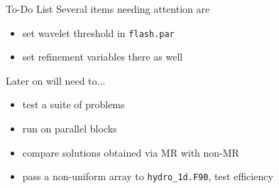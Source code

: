 \documentclass{beamer}
\begin{document}
\begin{frame}[fragile]{To-Do List}
  Several items needing attention are
  \begin{itemize}
    \setlength\itemsep{1em}
    \item<2-> set wavelet threshold in \texttt{flash.par}
    \item<3-> set refinement variables there as well
  \end{itemize}
  Later on will need to...
  \begin{itemize}
    \item<4-> test a suite of problems
    \item<5-> run on parallel blocks
    \item<6-> compare solutions obtained via MR with non-MR
    \item<7-> pass a non-uniform array to \texttt{hydro\_1d.F90}, test efficiency
  \end{itemize}
\end{frame}
\end{document}
